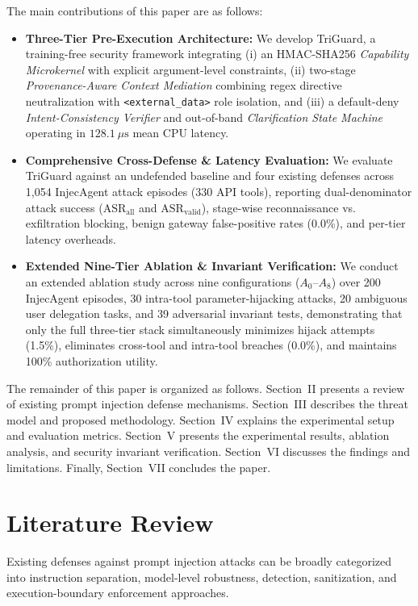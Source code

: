 \documentclass[conference]{IEEEtran}
\begin{document}
The main contributions of this paper are as follows:
\begin{itemize}
    \item \textbf{Three-Tier Pre-Execution Architecture:} We develop TriGuard, a training-free security framework integrating (i) an HMAC-SHA256 \emph{Capability Microkernel} with explicit argument-level constraints, (ii) two-stage \emph{Provenance-Aware Context Mediation} combining regex directive neutralization with \texttt{<external\_data>} role isolation, and (iii) a default-deny \emph{Intent-Consistency Verifier} and out-of-band \emph{Clarification State Machine} operating in $128.1~\mu\text{s}$ mean CPU latency.
    \item \textbf{Comprehensive Cross-Defense \& Latency Evaluation:} We evaluate TriGuard against an undefended baseline and four existing defenses across 1,054 InjecAgent attack episodes (330 API tools), reporting dual-denominator attack success ($\text{ASR}_{\text{all}}$ and $\text{ASR}_{\text{valid}}$), stage-wise reconnaissance vs. exfiltration blocking, benign gateway false-positive rates (0.0\%), and per-tier latency overheads.
    \item \textbf{Extended Nine-Tier Ablation \& Invariant Verification:} We conduct an extended ablation study across nine configurations ($A_0$--$A_8$) over 200 InjecAgent episodes, 30 intra-tool parameter-hijacking attacks, 20 ambiguous user delegation tasks, and 39 adversarial invariant tests, demonstrating that only the full three-tier stack simultaneously minimizes hijack attempts (1.5\%), eliminates cross-tool and intra-tool breaches (0.0\%), and maintains 100\% authorization utility.
\end{itemize}

The remainder of this paper is organized as follows. Section~II presents a review of existing prompt injection defense mechanisms. Section~III describes the threat model and proposed methodology. Section~IV explains the experimental setup and evaluation metrics. Section~V presents the experimental results, ablation analysis, and security invariant verification. Section~VI discusses the findings and limitations. Finally, Section~VII concludes the paper.

\section{Literature Review}
Existing defenses against prompt injection attacks can be broadly categorized into instruction separation, model-level robustness, detection, sanitization, and execution-boundary enforcement approaches.
\end{document}
